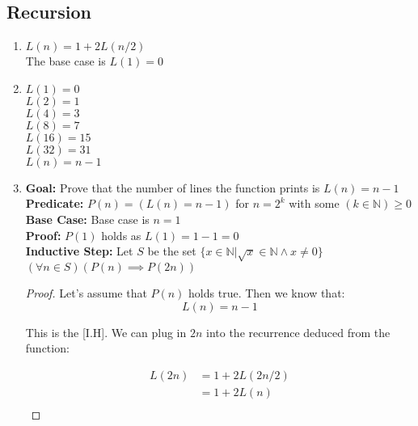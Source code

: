 \documentclass{article}
\begin{document}
\newpage

\subsection{Recursion}

\begin{enumerate}[label=(\alph*)]
    \item \(L(n) = 1 + 2L(n/2)\) \\
    The base case is \(L(1) = 0\)
    
    \item \(L(1) = 0\) \\
    \(L(2) = 1\) \\
    \(L(4) = 3\) \\
    \(L(8) = 7\) \\ 
    \(L(16) = 15\) \\
    \(L(32) = 31\) \\
    \(L(n) = n -1\)
    
    \item
        \textbf{Goal:} Prove that the number of lines the function prints is \(L(n) = n-1\)\\
        \textbf{Predicate:} \(P(n) = (L(n) = n-1)\) for \(n=2^k\) with some \((k \in \mathbb{N}) \geq 0\) \\
        \textbf{Base Case:} Base case is \(n=1\) \\
        \textbf{Proof:} \(P(1)\) holds as \(L(1) = 1-1 = 0\)\\
        \textbf{Inductive Step:} Let \(S\) be the set \(\{x \in \mathbb{N} | \sqrt{x} \in \mathbb{N} \land x \neq 0 \}\) \\ 
        \((\forall n \in S)(P(n) \implies P(2n))\) \\
    
        \begin{proof}
            Let's assume that \(P(n)\) holds true. Then we know that:
            \begin{displaymath}
                L(n) = n-1
            \end{displaymath}
            
            This is the [I.H]. We can plug in \(2n\) into the recurrence deduced from the function:
            
    
            \begin{align*}
                L(2n) &= 1 + 2L(2n/2) \\
                &= 1 + 2L(n) \\
            \end{align*}
            

\end{proof}
\end{enumerate}
\end{document}

